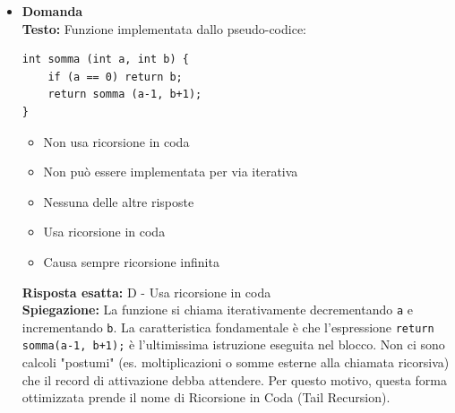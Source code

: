 \documentclass[12pt, a4paper]{article}
\newcounter{domandateoria}
\begin{document}
\begin{itemize}
    \item {}\textbf{Domanda \thedomandateoria} \\
    \textbf{Testo:} Funzione implementata dallo pseudo-codice:
\begin{verbatim}
int somma (int a, int b) {
    if (a == 0) return b;
    return somma (a-1, b+1);
}
\end{verbatim}
    \begin{itemize}
        \item[A)] Non usa ricorsione in coda
        \item[B)] Non può essere implementata per via iterativa
        \item[C)] Nessuna delle altre risposte
        \item[D)] Usa ricorsione in coda
        \item[E)] Causa sempre ricorsione infinita
    \end{itemize}
    \textbf{Risposta esatta:} D - Usa ricorsione in coda \\
    \textbf{Spiegazione:} La funzione si chiama iterativamente decrementando \texttt{a} e incrementando \texttt{b}. La caratteristica fondamentale è che l'espressione \texttt{return somma(a-1, b+1);} è l'ultimissima istruzione eseguita nel blocco. Non ci sono calcoli "postumi" (es. moltiplicazioni o somme esterne alla chiamata ricorsiva) che il record di attivazione debba attendere. Per questo motivo, questa forma ottimizzata prende il nome di Ricorsione in Coda (Tail Recursion).
    \vspace{0.3cm}


\end{itemize}
\end{document}
